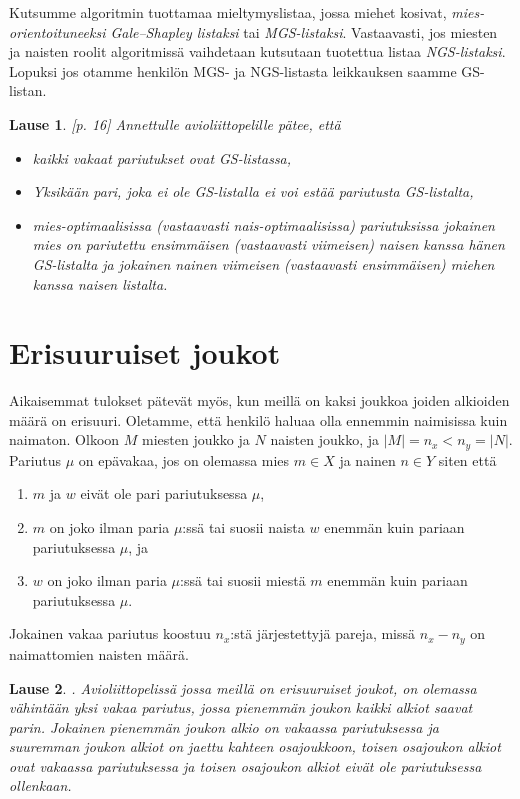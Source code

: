 \documentclass[finnish]{tktltiki2}
\newtheorem{lau}{Lause}
\theoremstyle{definition}
\theoremstyle{remark}
\begin{document}
Kutsumme algoritmin tuottamaa mieltymyslistaa, jossa miehet kosivat, \emph{mies-orientoituneeksi Gale--Shapley listaksi} tai \emph{MGS-listaksi}. Vastaavasti, jos miesten ja naisten roolit algoritmissä vaihdetaan kutsutaan tuotettua listaa \emph{NGS-listaksi}. Lopuksi jos otamme henkilön MGS- ja NGS-listasta leikkauksen saamme GS-listan.

\begin{lau}\cite{gusfield1989stable}[p. 16]
	Annettulle avioliittopelille pätee, että
	\begin{itemize}
		\item kaikki vakaat pariutukset ovat GS-listassa,
		\item Yksikään pari, joka ei ole GS-listalla ei voi estää pariutusta GS-listalta,
		\item mies-optimaalisissa (vastaavasti nais-optimaalisissa) pariutuksissa jokainen mies on pariutettu ensimmäisen (vastaavasti viimeisen) naisen kanssa hänen GS-listalta ja jokainen nainen viimeisen (vastaavasti ensimmäisen) miehen kanssa naisen listalta.
	\end{itemize}
\end{lau}


\section{Erisuuruiset joukot}
Aikaisemmat tulokset pätevät myös, kun meillä on kaksi joukkoa joiden alkioiden määrä on erisuuri. Oletamme, että henkilö haluaa olla ennemmin naimisissa kuin naimaton.
Olkoon $M$ miesten joukko ja $N$ naisten joukko, ja $|M| = n_x < n_y = |N|$. Pariutus $\mu$ on epävakaa, jos on olemassa mies $m \in X$ ja nainen $n \in Y$ siten että

\begin{enumerate}
	\item $m$ ja $w$ eivät ole pari pariutuksessa $\mu$,
	\item $m$ on joko ilman paria $\mu$:ssä tai suosii naista $w$ enemmän kuin pariaan pariutuksessa $\mu$, ja
	\item $w$ on joko ilman paria $\mu$:ssä tai suosii miestä $m$ enemmän kuin pariaan pariutuksessa $\mu$.
\end{enumerate}
Jokainen vakaa pariutus koostuu $n_x$:stä järjestettyjä pareja, missä $n_x - n_y$ on naimattomien naisten määrä.

\begin{lau}\cite[p. 26]{gusfield1989stable}.
Avioliittopelissä jossa meillä on erisuuruiset joukot, on olemassa vähintään yksi vakaa pariutus, jossa pienemmän joukon kaikki alkiot saavat parin. Jokainen pienemmän joukon alkio on vakaassa pariutuksessa ja suuremman joukon alkiot on jaettu kahteen osajoukkoon, toisen osajoukon alkiot ovat vakaassa pariutuksessa ja toisen osajoukon alkiot eivät ole pariutuksessa ollenkaan.
\end{lau}
\end{document}
